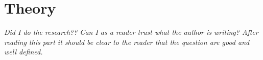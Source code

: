 \chapter{Theory}\label{cha:theory}

\textit{Did I do the research?? Can I as a reader trust what the author is writing? After reading this part it should be clear to the reader that the question are good and well defined.}






\newpage





\newpage



